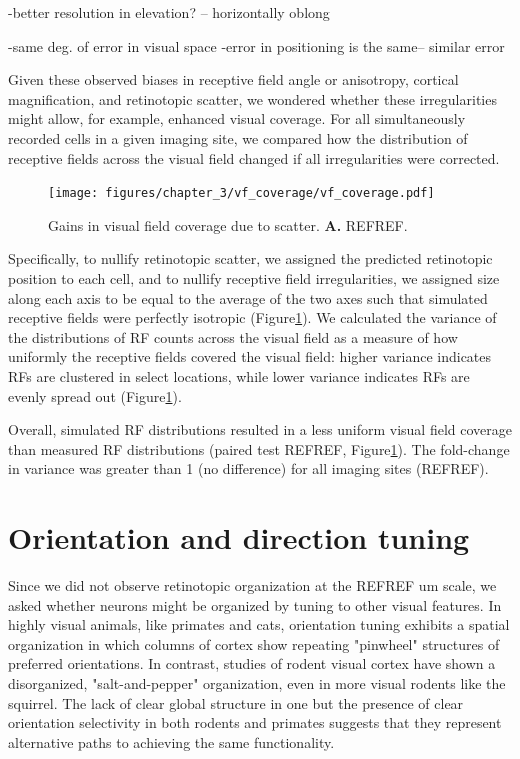 -better resolution in elevation? -- horizontally oblong

-same deg. of error in visual space
-error in positioning is the same-- similar error


Given these observed biases in receptive field angle or anisotropy, cortical magnification, and retinotopic scatter, we wondered whether these irregularities might allow, for example, enhanced visual coverage. For all simultaneously recorded cells in a given imaging site, we compared how the distribution of receptive fields across the visual field changed if all irregularities were corrected. 

\begin{figure}[t!]
    \texttt{[image: figures/chapter\_3/vf\_coverage/vf\_coverage.pdf]}
    \vspace{.1in}
    \caption[Compensatory visual field coverage]{Gains in visual field coverage due to scatter. \textbf{A.} REFREF.
    \label{fig:vf_coverage}}
\end{figure}

Specifically, to nullify retinotopic scatter, we assigned the predicted retinotopic position to each cell, and to nullify receptive field irregularities, we assigned size along each axis to be equal to the average of the two axes such that simulated receptive fields were perfectly isotropic (Figure\ref{fig:vf_coverage}). We calculated the variance of the distributions of RF counts across the visual field as a measure of how uniformly the receptive fields covered the visual field:  higher variance indicates RFs are clustered in select locations, while lower variance indicates RFs are evenly spread out (Figure\ref{fig:vf_coverage}). 

Overall, simulated RF distributions resulted in a less uniform visual field coverage than measured RF distributions (paired test REFREF, Figure\ref{fig:vf_coverage}). The fold-change in variance was greater than 1 (no difference) for all imaging sites (REFREF). %



\section{Orientation and direction tuning}
Since we did not observe retinotopic organization at the REFREF um scale, we asked whether neurons might be organized by tuning to other visual features. In highly visual animals, like primates and cats, orientation tuning exhibits a spatial organization in which columns of cortex show repeating "pinwheel" structures of preferred orientations\cite{REFREF}. In contrast, studies of rodent visual cortex have shown a disorganized, "salt-and-pepper" organization\cite{Ohki2005, REFREF}, even in more visual rodents like the squirrel\cite{VanHooser2005FunctionalRodent, REFREF}. The lack of clear global structure in one but the presence of clear orientation selectivity in both rodents and primates suggests that they represent alternative paths to achieving the same functionality.

